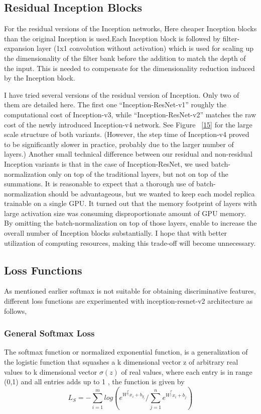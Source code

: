\documentclass[a4paper,12pt, twoside]{NITKReport}
\begin{document}
\subsection{Residual Inception Blocks}
\par For the residual versions of the Inception networks, Here cheaper Inception  blocks than the original Inception is used.Each Inception block is followed by filter-expansion layer (1x1 convolution  without  activation) which is used  for scaling up the dimensionality of the filter bank before the addition to match the depth of the input. This is needed to compensate for the dimensionality reduction induced by the Inception block.
\par I have tried several versions of the residual version of Inception. Only  two  of them are detailed here. The first one “Inception-ResNet-v1” roughly the computational cost of Inception-v3, while “Inception-ResNet-v2” matches the raw cost of the newly introduced Inception-v4 network. See Figure  ~\ref{15} for the large scale structure of both variants. (However, the step time of Inception-v4 proved to be significantly slower in practice, probably due to the larger number of layers.)
Another  small  technical  difference  between  our  residual and non-residual Inception variants is that in the case of Inception-ResNet, we used batch-normalization only on top of the traditional layers, but not on top of the summations. It is reasonable to expect that a thorough use of batch-normalization  should be advantageous, but we wanted to keep each model replica trainable on a single GPU. It turned out that the memory footprint of layers with large activation size was consuming disproportionate amount of GPU memory. By omitting the batch-normalization on top of those layers, enable to increase the overall number
of Inception blocks substantially. I hope that with better utilization of computing resources, making this trade-off will become unnecessary.\cite{DBLP:journals/corr/SzegedyIV16}

\subsection{Loss Functions}
\par As mentioned earlier softmax is not suitable for obtaining discriminative features, different loss functions are experimented with inception-resnet-v2 architecture as follows,

\subsubsection{General Softmax Loss}
\par  The softmax function or normalized exponential function, is a generalization of the logistic function that squashes a k dimensional vector z of arbitrary real values to k dimensional vector $\sigma (z)$ of real values, where each entry is in range (0,1) and all entries adds up to 1 \cite{100}, the function is given by
\begin{equation}
L_{S} = -\sum_{i=1}^{m}log (e^{W^{_{y_{i}}^{T}}x_{i}+b_{y_{i}}} / \sum_{j=1}^{n} e^{W^{_{j}^{T}}x_{i}+b_{j}})
\end{equation}
\end{document}
